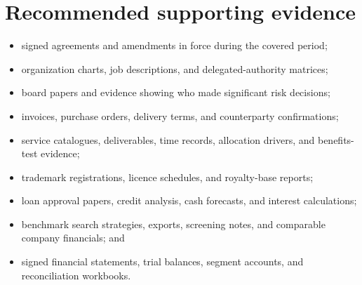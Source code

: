\section{Recommended supporting evidence}
\begin{itemize}
  \item signed agreements and amendments in force during the covered period;
  \item organization charts, job descriptions, and delegated-authority matrices;
  \item board papers and evidence showing who made significant risk decisions;
  \item invoices, purchase orders, delivery terms, and counterparty confirmations;
  \item service catalogues, deliverables, time records, allocation drivers, and
    benefits-test evidence;
  \item trademark registrations, licence schedules, and royalty-base reports;
  \item loan approval papers, credit analysis, cash forecasts, and interest
    calculations;
  \item benchmark search strategies, exports, screening notes, and comparable
    company financials; and
  \item signed financial statements, trial balances, segment accounts, and
    reconciliation workbooks.
\end{itemize}
